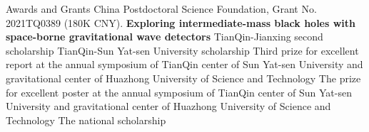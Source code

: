 \begin{rubric}{Awards and Grants}
    \entry*[2021-2023] China Postdoctoral Science Foundation, Grant No. 2021TQ0389 (180K CNY). \textbf{Exploring
    intermediate-mass black holes with space-borne gravitational wave detectors} 
%
    \entry*[2020] TianQin-Jianxing second scholarship
    \entry*[2019] TianQin-Sun Yat-sen University scholarship
    \entry*[2019] Third prize for excellent report at the annual symposium of TianQin center of Sun Yat-sen University and
    gravitational center of Huazhong University of Science and Technology 
    \entry*[2018] The prize for excellent poster at the annual symposium of TianQin center of Sun Yat-sen University and
    gravitational center of Huazhong University of Science and Technology 
    \entry*[2015] The national scholarship
\end{rubric}

